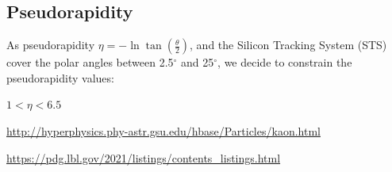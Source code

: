 \documentclass[11pt,a4paper]{article}
\begin{document}
\subsection{Pseudorapidity}
As pseudorapidity $\eta = -\ln{\tan(\frac{\theta}{2})}$, and the Silicon Tracking System (STS) cover the polar angles between 2.5$^{\circ}$ and 25$^{\circ}$, we decide to constrain the pseudorapidity values:
\begin{center}
    $ 1< \eta < 6.5 $
\end{center}

\begin{thebibliography}{9}

\url{http://hyperphysics.phy-astr.gsu.edu/hbase/Particles/kaon.html}

\url{https://pdg.lbl.gov/2021/listings/contents\_listings.html}


\end{thebibliography}
\end{document}
